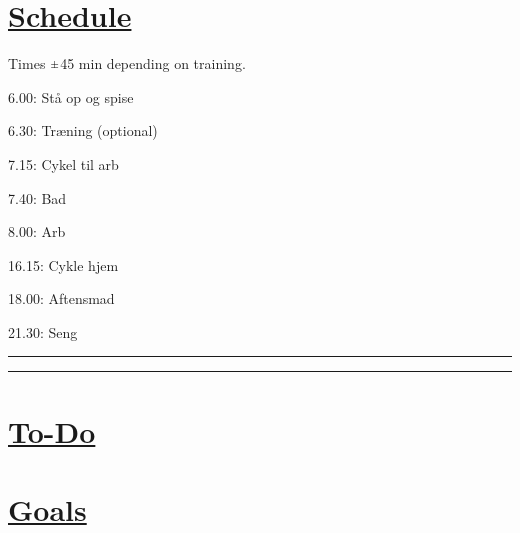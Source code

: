 \documentclass[11pt]{article}
\newcommand{\rpm}{\raisebox{.2ex}{$\scriptstyle\pm$}}
\begin{document}
\begin{multicols}{2}

\section*{\underline{Schedule}}
\vfill\null  
Times $\rpm$45 min depending on training. 
  \begin{todolist}[itemsep=8pt]
    \item 6.00: Stå op og spise
    \item 6.30: Træning (optional)
    \item 7.15: Cykel til arb
    \item 7.40: Bad
    \item 8.00: Arb
    \item 16.15: Cykle hjem
    \item 
    \item 
    \item 18.00: Aftensmad
    \item 21.30: Seng
  \end{todolist}

\begin{flushleft}
\rule{122pt}{1pt}\vline\rule{122pt}{1pt}
\end{flushleft}


\section*{\underline{To-Do}}
  \begin{todolist}[itemsep=8pt]
    \item 
    \item 
    \item 
    \item 
    \item 
  \end{todolist}

\vfill\null
\columnbreak

\section*{\underline{Goals}}
  \begin{todolist}[itemsep=8pt]
    \item 
    \item 
    \item 
    \item 
    \item 
  \end{todolist}


\end{multicols}
\end{document}
